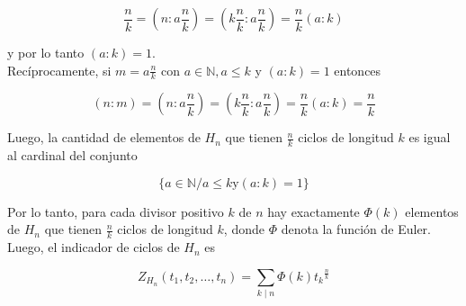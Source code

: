 \documentclass[10pt]{article}
\begin{document}
$$
\frac{n}{k}=\left(n: a \frac{n}{k}\right)=\left(k \frac{n}{k}: a \frac{n}{k}\right)=\frac{n}{k}(a: k)
$$

y por lo tanto $(a: k)=1$.\\
Recíprocamente, si $m=a \frac{n}{k}$ con $a \in \mathbb{N}, a \leq k$ y $(a: k)=1$ entonces

$$
(n: m)=\left(n: a \frac{n}{k}\right)=\left(k \frac{n}{k}: a \frac{n}{k}\right)=\frac{n}{k}(a: k)=\frac{n}{k}
$$

Luego, la cantidad de elementos de $H_{n}$ que tienen $\frac{n}{k}$ ciclos de longitud $k$ es igual al cardinal del conjunto

$$
\{a \in \mathbb{N} / a \leq k \mathrm{y}(a: k)=1\}
$$

Por lo tanto, para cada divisor positivo $k$ de $n$ hay exactamente $\Phi(k)$ elementos de $H_{n}$ que tienen $\frac{n}{k}$ ciclos de longitud $k$, donde $\Phi$ denota la función de Euler. Luego, el indicador de ciclos de $H_{n}$ es

$$
Z_{H_{n}}\left(t_{1}, t_{2}, \ldots, t_{n}\right)=\sum_{k \mid n} \Phi(k) t_{k}{ }^{\frac{n}{k}}
$$
\end{document}
